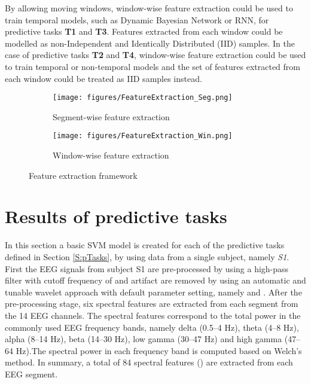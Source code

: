 \documentclass{article}
\begin{document}
By allowing moving windows, window-wise feature extraction could be used to train temporal models, such as Dynamic Bayesian Network or RNN, for predictive tasks \textbf{T1} and \textbf{T3}. Features extracted from each window could be modelled as non-Independent and Identically Distributed (IID) samples. In the case of predictive tasks \textbf{T2} and \textbf{T4}, window-wise feature extraction could be used to train temporal or non-temporal models and the set of features extracted from each window could be treated as IID samples instead.


\begin{figure}[ht]
     \centering
     \begin{subfigure}[b]{0.49\textwidth}
         \centering
         \texttt{[image: figures/FeatureExtraction\_Seg.png]}
         \caption{Segment-wise feature extraction}
         \label{fig:fe_segment}
     \end{subfigure}
     \hfill
     \begin{subfigure}[b]{0.49\textwidth}
         \centering
         \texttt{[image: figures/FeatureExtraction\_Win.png]}
         \caption{Window-wise feature extraction}
         \label{fig:fe_window}
     \end{subfigure}
        \caption{Feature extraction framework}
        \label{fig:feature_ext}
\end{figure}

\section{Results of predictive tasks}
\label{S:Results}
In this section a basic SVM model is created for each of the predictive tasks defined in Section \ref{S:pTasks}, by using data from a single subject, namely \textit{S1}. First the EEG signals from subject S1 are pre-processed by using a high-pass filter with cutoff frequency of  and artifact are removed by using an automatic and tunable wavelet approach \cite{bajaj2020automatic} with default parameter setting, namely  and . After the pre-processing stage,  six spectral features are extracted from each segment from the 14 EEG channels. The spectral features correspond to the total power in the commonly used EEG frequency bands,
namely delta (0.5–4 Hz), theta (4–8 Hz), alpha (8–14 Hz), beta (14–30 Hz), low gamma (30–47 Hz) and high gamma (47–64 Hz).The spectral power in each frequency band is computed based on Welch's method. In summary, a total of 84 spectral features () are extracted from each EEG segment. 
\end{document}
